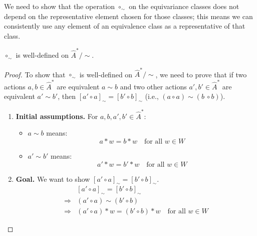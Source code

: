 We need to show that the operation $\circ_{\sim}$ on the equivariance classes does not depend on the representative element chosen for those classes; this means we can consistently use any element of an equivalence class as a representative of that class.

\begin{proposition}\label{prp:circ_sim_well_defined}
    $\circ_{\sim}$ is well-defined on $\hat{A}^{\ast}/\sim$.
\end{proposition}
\begin{proof}
    To show that $\circ_{\sim}$ is well-defined on $\hat{A}^{\ast}/\sim$, we need to prove that if two actions $a,b \in \hat{A}^{\ast}$ are equivalent $a \sim b$ and two other actions $a', b' \in \hat{A}^{\ast}$ are equivalent $a' \sim b'$, then $[a' \circ a]_{\sim} = [b' \circ b]_{\sim}$ (i.e., $(a \circ a) \sim (b\ \circ b)$).

    \begin{enumerate}[(1)]
        \item \textbf{Initial assumptions.}
              For $a, b, a', b' \in \hat{A}^{\ast}$:
              \begin{itemize}
                  \item $a \sim b$ means:
                        \begin{equation}
                            a \ast w = b \ast w \quad \text{for all } w\in W
                        \end{equation}
                  \item $a' \sim b'$ means:
                        \begin{equation}
                            a' \ast w = b' \ast w \quad \text{for all } w\in W
                        \end{equation}
              \end{itemize}

        \item \textbf{Goal.}
              We want to show $[a' \circ a]_{\sim} = [b' \circ b]_{\sim}$.
              \begin{align}
                                & [a' \circ a]_{\sim} = [b' \circ b]_{\sim}                               \\
                  \Rightarrow{} & (a' \circ a) \sim (b' \circ b)                                          \\
                  \Rightarrow{} & (a' \circ a) \ast w = (b' \circ b) \ast w \quad \text{for all } w \in W
              \end{align}


\end{enumerate}
\end{proof}
